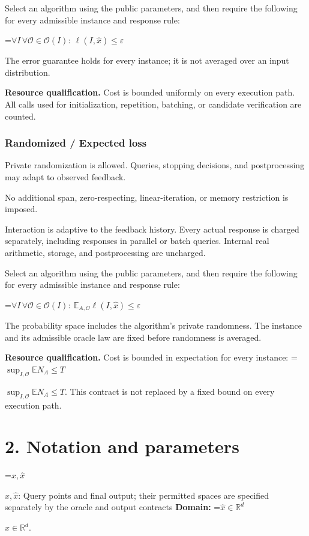 \documentclass[10pt,a4paper]{article}
\newcommand{\AtlasMath}[1]{\par\begingroup\centering\setbox0=\hbox{$\displaystyle #1$}\ifdim\wd0>1.4\linewidth\typeout{ATLAS WIDE FORMULA: \the\wd0}\fi\ifdim\wd0>\linewidth\resizebox{\linewidth}{!}{\box0}\else\box0\fi\par\endgroup}
\newcommand{\AtlasInlineMath}[1]{\begingroup\setbox0=\hbox{$#1$}\ifdim\wd0>.4\linewidth\endgroup\AtlasMath{#1}\else\endgroup$#1$\fi}
\begin{document}
Select an algorithm using the public parameters, and then require the following for every admissible instance and response rule:


\AtlasMath{\forall I\,\forall\mathcal{O}\in\mathcal{O}(I):\ \ell(I,\widehat{x})\le\varepsilon}


The error guarantee holds for every instance; it is not averaged over an input distribution.

\textbf{Resource qualification.} Cost is bounded uniformly on every execution path. All calls used for initialization, repetition, batching, or candidate verification are counted.

\subsubsection{Randomized / Expected loss}
Private randomization is allowed. Queries, stopping decisions, and postprocessing may adapt to observed feedback.

No additional span, zero-respecting, linear-iteration, or memory restriction is imposed.

Interaction is adaptive to the feedback history. Every actual response is charged separately, including responses in parallel or batch queries. Internal real arithmetic, storage, and postprocessing are uncharged.

Select an algorithm using the public parameters, and then require the following for every admissible instance and response rule:


\AtlasMath{\forall I\,\forall\mathcal{O}\in\mathcal{O}(I):\ \mathbb{E}_{A,\mathcal{O}}\ell(I,\widehat{x})\le\varepsilon}


The probability space includes the algorithm's private randomness. The instance and its admissible oracle law are fixed before randomness is averaged.

\textbf{Resource qualification.} Cost is bounded in expectation for every instance: \AtlasInlineMath{\sup_{I,\mathcal O}\mathbb E N_A\le T}. This contract is not replaced by a fixed bound on every execution path.

\section{2. Notation and parameters}
\AtlasInlineMath{x,\widehat{x}}: Query points and final output; their permitted spaces are specified separately by the oracle and output contracts \textbf{Domain:} \AtlasInlineMath{\widehat{x}\in \mathbb{R}^d}.
\end{document}
